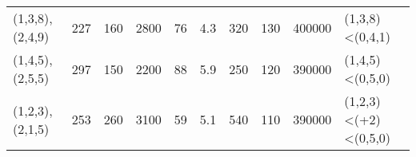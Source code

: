 \begin{tabular}{lrrrrrrrrl}
 (1,3,8),(2,4,9) &        227 &                               160 &                      2800       &                                76 &                            4.3  &                               320 &                           130   &     400000 & (1,3,8)<(0,4,1)      \\
 (1,4,5),(2,5,5) &        297 &                               150 &                      2200       &                                88 &                            5.9  &                               250 &                           120   &     390000 & (1,4,5)<(0,5,0)      \\
 (1,2,3),(2,1,5) &        253 &                               260 &                      3100       &                                59 &                            5.1  &                               540 &                           110   &     390000 & (1,2,3)<(+2)<(0,5,0) \\
\hline
\end{tabular}